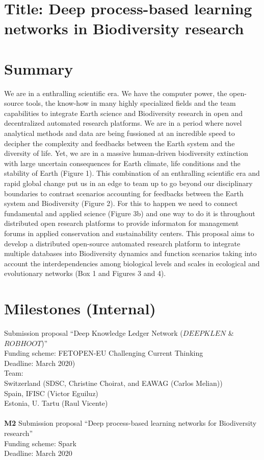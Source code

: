 \documentclass[authoryear,1p,12pt]{elsarticle}
\begin{document}
\section{{\bf Title: Deep process-based learning networks in Biodiversity research}}


\section{{\bf Summary}}
We are in a enthralling scientific era. We have the computer power,
the open-source tools, the know-how in many highly specialized fields
and the team capabilities to integrate Earth science and Biodiversity
research in open and decentralized automated research platforms. We
are in a period where novel analytical methods and data are being
fussioned at an incredible speed to decipher the complexity and
feedbacks between the Earth system and the diversity of life. Yet, we
are in a massive human-driven biodiversity extinction with large
uncertain consequences for Earth climate, life conditions and the
stability of Earth (Figure 1). This combination of an enthralling
scientific era and rapid global change put us in an edge to team up to
go beyond our disciplinary boundaries to contrast scenarios accounting
for feedbacks between the Earth system and Biodiversity (Figure
2). For this to happen we need to connect fundamental and applied
science (Figure 3b) and one way to do it is throughout distributed
open research platforms to provide informaton for management forums in
applied conservation and sustainability centers. This proposal aims to
develop a distributed open-source automated research platform to
integrate multiple databases into Biodiversity dynamics and function
scenarios taking into account the interdependencies among biological
levels and scales in ecological and evolutionary networks (Box 1 and
Figures 3 and 4).


\section{{\bf Milestones (Internal)}}

 Submission proposal ``Deep Knowledge Ledger Network ($DEEPKLEN$ \& $ROBHOOT$)''\\
Funding scheme: FETOPEN-EU Challenging Current Thinking\\
Deadline: March 2020)\\
Team:\\
Switzerland (SDSC, Christine Choirat, and EAWAG (Carlos Melian))\\
Spain, IFISC (Victor Eguiluz)\\
Estonia, U. Tartu (Raul Vicente)\\
\\
{\bf M2} Submission proposal ``Deep process-based learning networks for Biodiversity research''\\
Funding scheme: Spark\\
Deadline: March 2020\\
\end{document}
